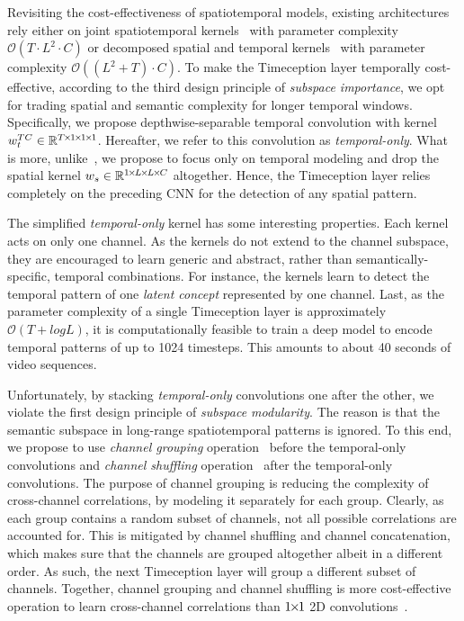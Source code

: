 \documentclass[10pt,twocolumn,letterpaper]{article}
\begin{document}
Revisiting the cost-effectiveness of spatiotemporal models, existing architectures rely either on joint spatiotemporal kernels~\cite{carreira2017quo} with parameter complexity $\mathcal{O}(T\cdot L^2\cdot C)$ or decomposed spatial and temporal kernels~\cite{xie2017rethinking,tran2018closer} with parameter complexity $\mathcal{O}((L^2+T)\cdot C)$.
To make the Timeception layer temporally cost-effective, according to the third design principle of \emph{subspace importance}, we opt for trading spatial and semantic complexity for longer temporal windows.
Specifically, we propose depthwise-separable temporal convolution with kernel $w^{TC}_{t} \in \mathbb{R}^{T {\mkern-2mu\times\mkern-2mu} 1 {\mkern-2mu\times\mkern-2mu} 1 {\mkern-2mu\times\mkern-2mu} 1}$. Hereafter, we refer to this convolution as \emph{temporal-only}.
What is more, unlike~\cite{carreira2017quo,xie2017rethinking,tran2018closer}, we propose to focus only on temporal modeling and drop the spatial kernel $w_{s} \in \mathbb{R}^{1 {\mkern-2mu\times\mkern-2mu} L {\mkern-2mu\times\mkern-2mu} L {\mkern-2mu\times\mkern-2mu} C}$ altogether.
Hence, the Timeception layer relies completely on the preceding CNN for the detection of any spatial pattern.

The simplified \emph{temporal-only} kernel has some interesting properties.
Each kernel acts on only one channel.
As the kernels do not extend to the channel subspace, they are encouraged to learn generic and abstract, rather than semantically-specific, temporal combinations.
For instance, the kernels learn to detect the temporal pattern of one \emph{latent concept} represented by one channel.
Last, as the parameter complexity of a single Timeception layer is approximately $\mathcal{O}(T + log L)$, it is computationally feasible to train a deep model to encode temporal patterns of up to 1024 timesteps. 
This amounts to about 40 seconds of video sequences.

Unfortunately, by stacking \emph{temporal-only} convolutions one after the other, we violate the first design principle of \emph{subspace modularity}.
The reason is that the semantic subspace in long-range spatiotemporal patterns is ignored.
To this end, we propose to use \emph{channel grouping} operation~\cite{xie2017aggregated} before the temporal-only convolutions and \emph{channel shuffling} operation~\cite{zhang2017shufflenet} after the temporal-only convolutions.
The purpose of channel grouping is reducing the complexity of cross-channel correlations, by modeling it separately for each group.
Clearly, as each group contains a random subset of channels, not all possible correlations are accounted for.
This is mitigated by channel shuffling and channel concatenation, which makes sure that the channels are grouped altogether albeit in a different order.
As such, the next Timeception layer will group a different subset of channels.
Together, channel grouping and channel shuffling is more cost-effective operation to learn cross-channel correlations than $1{\mkern-2mu\times\mkern-2mu}1$ 2D convolutions~\cite{chollet2016xception}.
\end{document}
